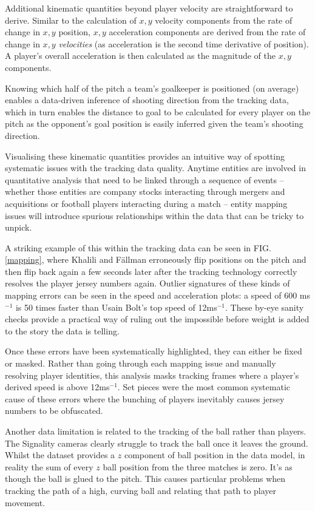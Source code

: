 \documentclass[twocolumn,prl,nobalancelastpage,aps,10pt]{revtex4-1}
\begin{document}
Additional kinematic quantities beyond player velocity are straightforward to derive. Similar to the calculation of $x,y$ velocity components from the rate of change in $x,y$ position, $x,y$ acceleration components are derived from the rate of change in $x,y$ \textit{velocities} (as acceleration is the second time derivative of position). A player's overall acceleration is then calculated as the magnitude of the $x,y$ components.

Knowing which half of the pitch a team's goalkeeper is positioned (on average) enables a data-driven inference of shooting direction from the tracking data, which in turn enables the distance to goal to be calculated for every player on the pitch as the opponent's goal position is easily inferred given the team's shooting direction.

Visualising these kinematic quantities provides an intuitive way of spotting systematic issues with the tracking data quality. Anytime entities are involved in quantitative analysis that need to be linked through a sequence of events -- whether those entities are company stocks interacting through mergers and acquisitions or football players interacting during a match -- entity mapping issues will introduce spurious relationships within the data that can be tricky to unpick.

A striking example of this within the tracking data can be seen in FIG. \ref{mapping}, where Khalili and F{\"a}llman erroneously flip positions on the pitch and then flip back again a few seconds later after the tracking technology correctly resolves the player jersey numbers again. Outlier signatures of these kinds of mapping errors can be seen in the speed and acceleration plots: a speed of 600 ms$^{-1}$ is 50 times faster than Usain Bolt's top speed of 12ms$^{-1}$. These by-eye sanity checks provide a practical way of ruling out the impossible before weight is added to the story the data is telling.

Once these errors have been systematically highlighted, they can either be fixed or masked. Rather than going through each mapping issue and manually resolving player identities, this analysis masks tracking frames where a player's derived speed is above 12ms$^{-1}$. Set pieces were the most common systematic cause of these errors where the bunching of players inevitably causes jersey numbers to be obfuscated.

Another data limitation is related to the tracking of the ball rather than players. The Signality cameras clearly struggle to track the ball once it leaves the ground. Whilst the dataset provides a $z$ component of ball position in the data model, in reality the sum of every $z$ ball position from the three matches is zero. It's as though the ball is glued to the pitch. This causes particular problems when tracking the path of a high, curving ball and relating that path to player movement.
\end{document}
